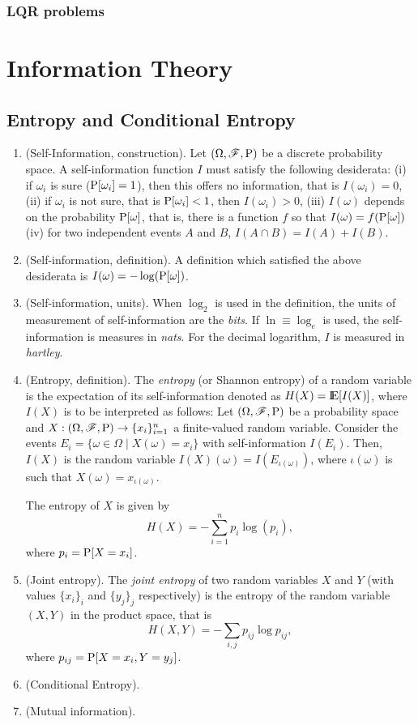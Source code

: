 \documentclass[a4paper,10pt]{scrbook}
\begin{document}
\subsection{LQR problems}

\chapter{Information Theory}
\section{Entropy and Conditional Entropy}
\begin{enumerate}
 \item (Self-Information, construction). Let $(\Omega,\mathscr{F},\mathrm{P})$ be a discrete probability space. A self-information function $I$ must satisfy the 
       following desiderata: 
       (i) if $\omega_i$ is sure ($\mathrm{P}[\omega_i]=1$), then this offers no information, that is $I(\omega_i)=0$, 
       (ii) if $\omega_i$ is not sure, that is $\mathrm{P}[\omega_i]<1$, then $I(\omega_i)>0$,
       (iii) $I(\omega)$ depends on the probability $\mathrm{P}[\omega]$, that is, there is a function $f$ so that $I(\omega)=f(\mathrm{P}[\omega])$
       (iv) for two independent events $A$ and $B$, $I(A\cap B)=I(A)+I(B)$.
 \item (Self-information, definition). A definition which satisfied the above desiderata is $I(\omega)=-\log(\mathrm{P}[\omega])$. 
 \item (Self-information, units). When $\log_2$ is used in the definition, the units of measurement of self-information are the \textit{bits}.
       If $\ln\equiv \log_e$ is used, the self-information is measures in \textit{nats}. 
       For the decimal logarithm, $I$ is measured in \textit{hartley}.
 \item (Entropy, definition). The \textit{entropy} (or Shannon entropy) of a random variable is the expectation of its self-information denoted 
       as $H(X)=\E[I(X)]$, where $I(X)$ is to be interpreted as follows: Let $(\Omega,\mathscr{F},\mathrm{P})$ be a probability space and $X:(\Omega,\mathscr{F},\mathrm{P})\to \{x_i\}_{i=1}^{n}$
       a finite-valued random variable. Consider the events $E_i=\{\omega\in\Omega {}\mid{} X(\omega) = x_i\}$ with self-information 
       $I(E_i)$. Then, $I(X)$ is the random variable $I(X)(\omega) = I(E_{\iota(\omega)})$, where $\iota(\omega)$ is such 
       that $X(\omega) = x_{\iota(\omega)}$.
       
       The entropy of $X$ is given by
       \[
        H(X) = -\sum_{i=1}^{n}p_i \log(p_i),
       \]
       where $p_i = \mathrm{P}[X=x_i]$.
 \item (Joint entropy). The \textit{joint entropy} of two random variables $X$ and $Y$ (with values $\{x_i\}_i$ and $\{y_j\}_j$
       respectively) is the entropy of the random variable 
       $(X,Y)$ in the product space, that is
       \[
        H(X,Y) = -\sum_{i,j}p_{ij}\log p_{ij},
       \]
       where $p_{ij} = \mathrm{P}[X=x_i, Y=y_j]$.
 \item (Conditional Entropy).
 \item (Mutual information).
\end{enumerate}
\end{document}
